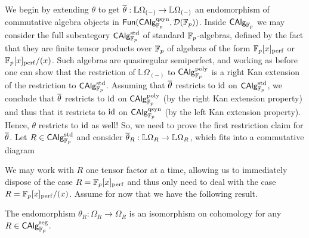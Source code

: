 \documentclass[11pt]{article}
\renewcommand{\L}{\mathbb{L}} %
\DeclareMathOperator{\perf}{perf} %
\DeclareMathOperator{\qsyn}{qsyn} %
\begin{document}
We begin by extending $\theta$ to get $\ov{\theta}: \L\Omega_{(-)}\to\L\Omega_{(-)}$ an endomorphism of commutative algebra objects in $\Fun(\CAlg_{\F_p}^{\qsyn},\D(\F_p))$. Inside $\operatorname{\mathsf{CAlg}}_{\mathbb{F}_p}$ we may consider the full subcategory $\operatorname{\mathsf{CAlg}}_{\mathbb{F}_p}^{\operatorname{std}}$ of standard $\mathbb{F}_p$-algebras, defined by the fact that they are finite tensor products over $\mathbb{F}_p$ of algebras of the form $\F_p[x]_{\perf}$ or $\F_p[x]_{\perf}/(x)$. Such algebras are quasiregular semiperfect, and working as before one can show that the restriction of $\L\Omega_{(-)}$ to $\operatorname{\mathsf{CAlg}}_{\mathbb{F}_p}^{\operatorname{poly}}$ is a right Kan extension of the restriction to $\operatorname{\mathsf{CAlg}}_{\mathbb{F}_p}^{\operatorname{std}}$. Assuming that $\overline{\theta}$ restricts to $\operatorname{id}$ on $\operatorname{\mathsf{CAlg}}_{\mathbb{F}_p}^{\operatorname{std}}$, we conclude that $\overline{\theta}$ restricts to $\operatorname{id}$ on $\operatorname{\mathsf{CAlg}}_{\mathbb{F}_p}^{\operatorname{poly}}$ (by the right Kan extension property) and thus that it restricts to $\operatorname{id}$ on $\CAlg_{\F_p}^{\qsyn}$ (by the left Kan extension property). Hence, $\theta$ restricts to $\operatorname{id}$ as well! So, we need to prove the first restriction claim for $\overline{\theta}$. Let $R\in\operatorname{\mathsf{CAlg}}_{\mathbb{F}_p}^{\operatorname{std}}$ and consider $\ov{\theta}_R: \L\Omega_R\to\L\Omega_R$, which fits into a commutative diagram
\begin{center}
\end{center}
We may work with $R$ one tensor factor at a time, allowing us to immediately dispose of the case $R=\F_p[x]_{\perf}$ and thus only need to deal with the case $R=\F_p[x]_{\perf}/(x)$. Assume for now that we have the following result.

\begin{lemma}
The endomorphism $\theta_R: \Omega_R\to\Omega_R$ is an isomorphism on cohomology for any $R\in\operatorname{\mathsf{CAlg}}_{\mathbb{F}_p}^{\operatorname{reg}}$.
\end{lemma}
\end{document}
